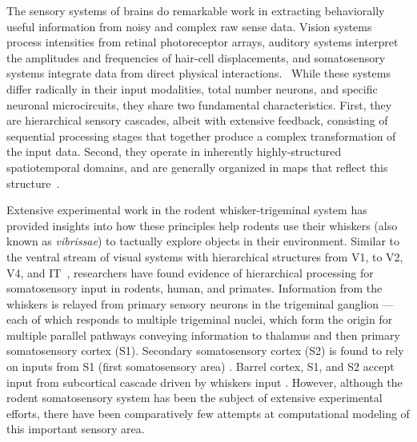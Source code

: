 The sensory systems of brains do remarkable work in extracting behaviorally useful information from noisy and complex raw sense data. 
Vision systems process intensities from retinal photoreceptor arrays, auditory systems interpret the amplitudes and frequencies of hair-cell displacements, and somatosensory systems integrate data from direct physical interactions.~\cite{purves2001neuroscience} 
While these systems differ radically in their input modalities, total number neurons, and specific neuronal microcircuits, they share two fundamental characteristics. 
First, they are hierarchical sensory cascades, albeit with extensive feedback, consisting of sequential processing stages that together produce a complex transformation of the input data.  
Second, they operate in inherently highly-structured spatiotemporal domains, and are generally organized in maps that reflect this structure~\cite{felleman1991distributed}.

Extensive experimental work in the rodent whisker-trigeminal system has provided insights into how these principles help rodents use their whiskers (also known as \emph{vibrissae}) to tactually explore objects in their environment.  
Similar to the ventral stream of visual systems with hierarchical structures from V1, to V2, V4, and IT~\cite{felleman1991distributed, Goodale1992, Diamond2008, yu, moore, dosman, bensmaia}, researchers have found evidence of hierarchical processing for somatosensory input in rodents, human, and primates\cite{Pons1987, Inui2004, Iwamura1998}. 
Information from the whiskers is relayed from primary sensory neurons in the trigeminal ganglion --- each of which responds to multiple trigeminal nuclei, which form the origin for multiple parallel pathways conveying information to thalamus and then primary somatosensory cortex (S1).
Secondary somatosensory cortex (S2) is found to rely on inputs from S1 (first somatosensory area) \cite{Pons1987, Petersen2007}. 
Barrel cortex, S1, and S2 accept input from subcortical cascade driven by  whiskers input \cite{Diamond2008}. 
However, although the rodent somatosensory system has been the subject of extensive experimental efforts\cite{armstrong1992flow, petersen2003spatiotemporal, kerr2007spatial, von2007neuronal}, there have been comparatively few attempts at computational modeling of this important sensory area. 

